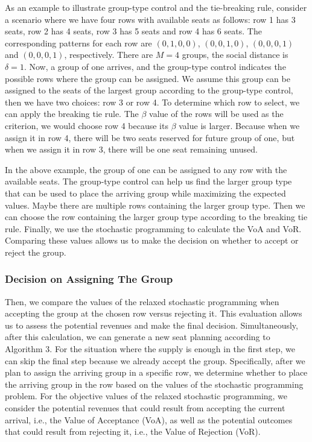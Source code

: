 As an example to illustrate group-type control and the tie-breaking rule, consider a scenario where we have four rows with available seats as follows: row 1 has 3 seats, row 2 has 4 seats, row 3 has 5 seats and row 4 has 6 seats. The corresponding patterns for each row are $(0,1,0,0)$, $(0,0,1,0)$, $(0,0,0,1)$ and $(0,0,0,1)$, respectively. There are $M =4$ groups, the social distance is $\delta =1$. Now, a group of one arrives,  and the group-type control indicates the possible rows where the group can be assigned. We assume this group can be assigned to the seats of the largest group according to the group-type control, then we have two choices: row 3 or row 4. To determine which row to select, we can apply the breaking tie rule. The $\beta$ value of the rows will be used as the criterion, we would choose row 4 because its $\beta$ value is larger. Because when we assign it in row 4, there will be two seats reserved for future group of one, but when we assign it in row 3, there will be one seat remaining unused.

In the above example, the group of one can be assigned to any row with the available seats. The group-type control can help us find the larger group type that can be used to place the arriving group while maximizing the expected values. Maybe there are multiple rows containing the larger group type. Then we can choose the row containing the larger group type according to the breaking tie rule. 
Finally, we use the stochastic programming to calculate the VoA and VoR. Comparing these values allows us to make the decision on whether to accept or reject the group.

\subsubsection*{Decision on Assigning The Group}
Then, we compare the values of the relaxed stochastic programming when accepting the group at the chosen row versus rejecting it. This evaluation allows us to assess the potential revenues and make the final decision. Simultaneously, after this calculation, we can generate a new seat planning according to Algorithm 3. For the situation where the supply is enough in the first step, we can skip the final step because we already accept the group. Specifically, after we plan to assign the arriving group in a specific row, we determine whether to place the arriving group in the row based on the values of the stochastic programming problem. For the objective values of the relaxed stochastic programming, we consider the potential revenues that could result from accepting the current arrival, i.e., the Value of Acceptance (VoA), as well as the potential outcomes that could result from rejecting it, i.e., the Value of Rejection (VoR). 


